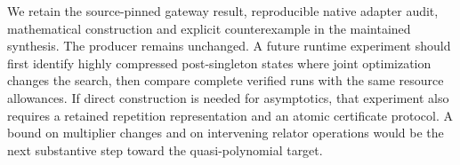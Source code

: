 We retain the source-pinned gateway result, reproducible native adapter audit,
mathematical construction and explicit counterexample in the maintained
synthesis. The producer remains unchanged. A future runtime experiment should
first identify highly compressed post-singleton states where joint optimization
changes the search, then compare complete verified runs with the same resource
allowances. If direct construction is needed for asymptotics, that experiment
also requires a retained repetition representation and an atomic certificate
protocol. A bound on multiplier changes and on intervening relator operations
would be the next substantive step toward the quasi-polynomial target.
